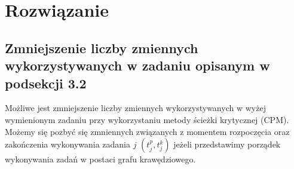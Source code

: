 \documentclass[
    12pt, %
]{../fphw}
\begin{document}
\section{Rozwiązanie}
\subsection{Zmniejszenie liczby zmiennych wykorzystywanych w zadaniu opisanym w podsekcji 3.2}
Możliwe jest zmniejszenie liczby zmiennych wykorzystywanych w wyżej wymienionym
zadaniu przy wykorzystaniu metody ścieżki krytycznej (CPM).
Możemy się pozbyć się zmniennych związanych z momentem rozpoczęcia oraz zakończenia
wykonywania zadania \(j\) \((t^p_j, t^k_j)\) jeżeli przedstawimy porządek wykonywania zadań w postaci grafu krawędziowego.
\end{document}
